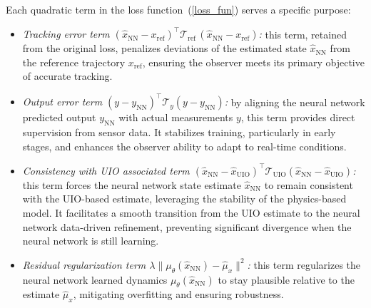 \documentclass{ifacconf}
\def\eqref#1{(\ref{#1})}
\def\nn{\mathrm{NN}}
\def\uio{\mathrm{UIO}}
\def\refx{\mathrm{ref}}
\begin{document}
Each quadratic term in the loss function~\eqref{loss_fun} serves a specific purpose:
\begin{itemize}
    \item {\it Tracking error term $(\hat{x}_{\nn} - x_{\text{ref}})^{\top} \mathcal{T}_{\refx}\,(\hat{x}_{\nn} - x_{\text{ref}})$:} this term, retained from the original loss, penalizes deviations of the estimated state $\hat{x}_{\nn}$ from the reference trajectory $x_{\text{ref}}$, ensuring the observer meets its primary objective of accurate tracking.
    \item {\it Output error term $(y - y_{\nn})^{\top} \mathcal{T}_{y} (y - y_{\nn})$:} by aligning the neural network predicted output $y_{\nn}$ with actual measurements $y$, this term provides direct supervision from sensor data. It stabilizes training, particularly in early stages, and enhances the observer ability to adapt to real-time conditions.
    \item {\it Consistency with UIO associated term $(\hat{x}_{\nn} - \hat{x}_{\uio})^{\top} \mathcal{T}_{\uio} (\hat{x}_{\nn} - \hat{x}_{\uio})$:} this term forces the neural network state estimate $\hat{x}_{\nn}$ to remain consistent with the UIO-based estimate, leveraging the stability of the physics-based model. It facilitates a smooth transition from the UIO estimate to the neural network data-driven refinement, preventing significant divergence when the neural network is still learning.
    \item {\it Residual regularization term $\lambda \| \mu_{\theta}(\hat{x}_{\nn}) - \hat{\mu}_{x} \|^2$:} this term regularizes the neural network learned dynamics $\mu_{\theta}(\hat{x}_{\nn})$ to stay plausible relative to the estimate $\hat{\mu}_{x}$, mitigating overfitting and ensuring robustness.
 
\end{itemize}






















\end{document}
